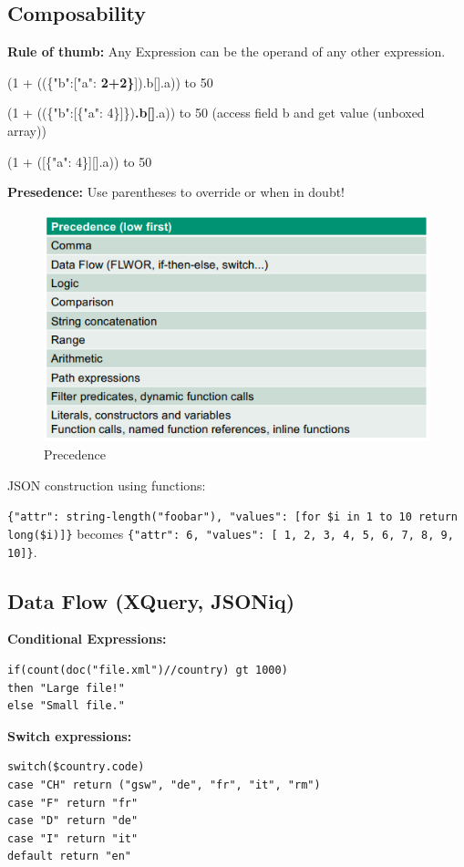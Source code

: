 \documentclass[11pt,oneside,a4paper]{article}
\begin{document}
{\subsection{Composability}

\textbf{Rule of thumb:} Any Expression can be the operand of any other expression.

\begin{compactitem}
\item (1 + ((\{"b":[{"a": \textbf{2+2\}}]}).b[].a)) to 50
\item (1 + ((\{"b":[\{"a": 4\}]\})\textbf{.b[]}.a)) to 50 (access field b and get value (unboxed array))
\item (1 + ([\{"a": 4\}][].a)) to 50
\end{compactitem}


\textbf{Presedence:} Use parentheses to override or when in doubt!

\begin{figure}[hb!]
	\centering
	\includegraphics[width=0.4\linewidth]{figures/querytrees_precedence}
	\caption{Precedence}
	\label{fig:querytreesprecedence}
\end{figure}

JSON construction using functions:

\texttt{\{"attr": string-length("foobar"), "values": [for \$i in 1 to 10 return long(\$i)]\}} becomes \texttt{\{"attr": 6, "values": [ 1, 2, 3, 4, 5, 6, 7, 8, 9, 10]\}}.


\subsection{Data Flow (XQuery, JSONiq)}

\textbf{Conditional Expressions:}
\begin{lstlisting}
if(count(doc("file.xml")//country) gt 1000)
then "Large file!"
else "Small file."
\end{lstlisting}

\textbf{Switch expressions:}

\begin{lstlisting}
switch($country.code)
case "CH" return ("gsw", "de", "fr", "it", "rm")
case "F" return "fr"
case "D" return "de"
case "I" return "it"
default return "en"
\end{lstlisting}

}
\end{document}
